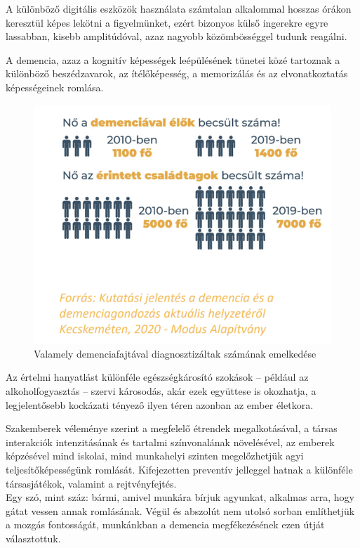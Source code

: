 \documentclass[tocnopagenum]{thesis-ekf}
\theoremstyle{definition}
\theoremstyle{remark}
\begin{document}
	A különböző digitális eszközök használata számtalan alkalommal hosszas órákon keresztül képes lekötni a figyelmünket, ezért bizonyos külső ingerekre egyre lassabban, kisebb amplitúdóval, azaz nagyobb közömbösséggel tudunk reagálni. 
	
	A demencia, azaz a kognitív képességek leépülésének tünetei közé tartoznak a különböző beszédzavarok, az ítélőképesség, a memorizálás és az elvonatkoztatás képességeinek romlása.
	
	\begin{figure}[h!]
		\centering
		\includegraphics[scale=0.7]{images/demencia.png}
		\caption{Valamely demenciafajtával diagnosztizáltak számának emelkedése}
		\label{fig:demencia}
	\end{figure}
	
	Az értelmi hanyatlást különféle egészségkárosító szokások -- például az alkoholfogyasztás -- szervi károsodás, akár ezek együttese is okozhatja, a legjelentősebb kockázati tényező ilyen téren azonban az ember életkora. 
	
	Szakemberek véleménye szerint a megfelelő étrendek megalkotásával, a társas interakciók intenzitásának és tartalmi színvonalának növelésével, az emberek képzésével mind iskolai, mind munkahelyi szinten megelőzhetjük agyi teljesítőképességünk romlását. 
	Kifejezetten preventív jelleggel hatnak a különféle társasjátékok, valamint a rejtvényfejtés.\\Egy szó, mint száz: bármi, amivel munkára bírjuk agyunkat, alkalmas arra, hogy gátat vessen annak romlásának.
	Végül és abszolút nem utolsó sorban említhetjük a mozgás fontosságát, munkánkban a demencia megfékezésének ezen útját választottuk.
	
\end{document}
